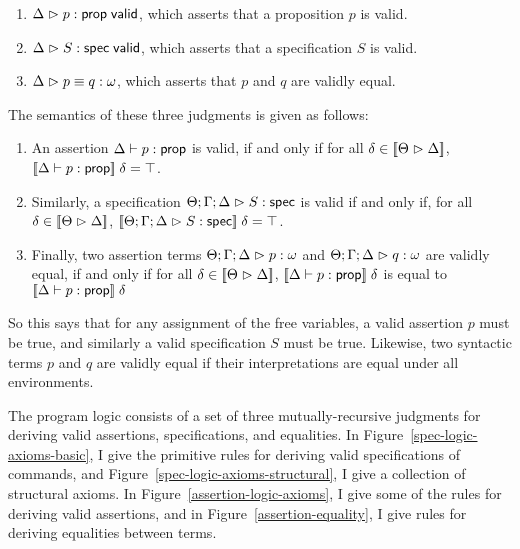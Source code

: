 \begin{enumerate}
\item ${\Delta} \vartriangleright {p} : \mathsf{prop} \;\mathsf{valid}$, which asserts that a proposition $p$ is valid.

\item ${\Delta} \vartriangleright {S} : \mathsf{spec} \;\mathsf{valid}$, which asserts that a specification $S$ is valid.

\item ${\Delta} \vartriangleright {p} \equiv {q} : {\omega}$, which asserts that $p$ and $q$ are validly equal.
\end{enumerate}
%

\noindent The semantics of these three judgments is given as follows:
\begin{enumerate}
\item An assertion ${\Delta} \vdash {p} : {\mathsf{prop}}$ is valid, if and only if
for all $\delta \in [\![{{\Theta} \vartriangleright {\Delta}}]\!]$,
$[\![{{\Delta} \vdash {p} : {\mathsf{prop}}}]\!]\;\delta = \top$.

\item Similarly, a specification ${\Theta; \Gamma; \Delta} \vartriangleright {S} : \mathsf{spec}$ is valid if and only
if, for all $\delta \in [\![{{\Theta} \vartriangleright {\Delta}}]\!]$,
$[\![{{\Theta; \Gamma; \Delta} \vartriangleright {S} : \mathsf{spec}}]\!]\;\delta = \top$.

\item Finally, two assertion terms ${\Theta; \Gamma; \Delta} \vartriangleright {p} : {\omega}$ and
${\Theta; \Gamma; \Delta} \vartriangleright {q} : {\omega}$ are validly equal, if and only if for all $\delta
\in [\![{{\Theta} \vartriangleright {\Delta}}]\!]$,
$[\![{{\Delta} \vdash {p} : {\mathsf{prop}}}]\!]\;\delta$ is equal to
$[\![{{\Delta} \vdash {p} : {\mathsf{prop}}}]\!]\;\delta$
\end{enumerate}

So this says that for any assignment of the free variables, a valid
assertion $p$ must be true, and similarly a valid specification $S$
must be true. Likewise, two syntactic terms $p$ and $q$ are validly
equal if their interpretations are equal under all environments. 

The program logic consists of a set of three mutually-recursive
judgments for deriving valid assertions, specifications, and
equalities. In Figure~\ref{spec-logic-axioms-basic}, I give the
primitive rules for deriving valid specifications of commands, and
Figure~\ref{spec-logic-axioms-structural}, I give a collection of
structural axioms.  In Figure~\ref{assertion-logic-axioms}, I give
some of the rules for deriving valid assertions, and in
Figure~\ref{assertion-equality}, I give rules for deriving equalities
between terms.

